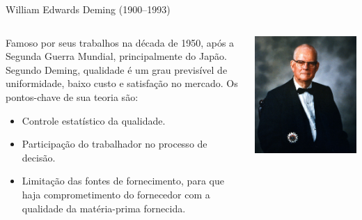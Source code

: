 \begin{frame}{William Edwards Deming (1900--1993)}
  
  \begin{columns}
    \begin{column}{.65\textwidth}
      Famoso por seus trabalhos na década de 1950, após a Segunda Guerra Mundial, principalmente do Japão. Segundo Deming, qualidade é um grau previsível de uniformidade, baixo custo e satisfação no mercado. Os pontos-chave de sua teoria são:
\begin{itemize}[<+->]
\item Controle estatístico da qualidade.
\item Participação do trabalhador no processo de decisão.
\item Limitação das fontes de fornecimento, para que haja comprometimento do fornecedor com a qualidade da matéria-prima fornecida.
\end{itemize}
\end{column}
    \begin{column}{.35\textwidth}
      \includegraphics[scale=.175]{img/deming.png}
    \end{column}
  \end{columns}
\end{frame}

